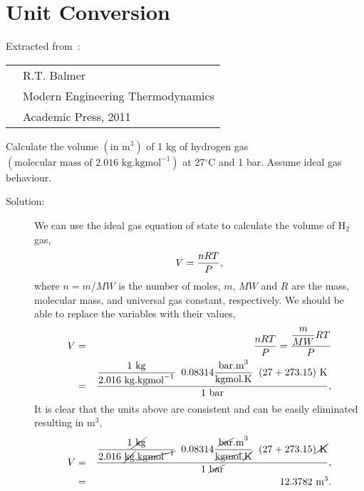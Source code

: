
\chapter{Unit Conversion}


Extracted from~\cite{Balmer_Book}:\\
  \begin{tabular}{c l}
     \hspace{1cm} & R.T. Balmer \\
                  & Modern Engineering Thermodynamics \\
                  & Academic Press, 2011  \\
  \end{tabular}


\begin{list}{\bf Example :~}{}
%
   \item\label{Example:UnitConversion1} Calculate the volume $\left(\text{in m}^{3}\right)$ of 1 kg of hydrogen gas $\left(\text{molecular mass of 2.016 kg.kgmol}^{-1}\right)$ at 27$^{\circ}$C and 1 bar. Assume ideal gas behaviour.
     \begin{description}
        \item[Solution:] We can use the ideal gas equation of state to calculate the volume of H$_{2}$ gas,
           \begin{displaymath}
              V = \displaystyle\frac{nRT}{P},
           \end{displaymath}
           where $n = m/MW$ is the number of moles, $m$, $MW$ and $R$ are the mass, molecular mass, and universal gas constant, respectively. We should be able to replace the variables with their values,
           \begin{eqnarray}
              V &=& \displaystyle\frac{nRT}{P} = \displaystyle\frac{ \displaystyle\frac{m}{MW} R T }{ P } \nonumber \\
                &=& \displaystyle\frac{ \displaystyle\frac{ 1\text{ kg}}{ 2.016\text{ kg.kgmol}^{-1}}\;\; 0.08314\displaystyle\frac{\text{bar.m}^{3}}{\text{kgmol.K}}\;\; ( 27 + 273.15)\text{ K}}{ 1 \text{ bar}},\nonumber
           \end{eqnarray}
           It is clear that the units above are consistent and can be easily eliminated resulting in m$^{3}$,
           \begin{eqnarray}
              V &=& \displaystyle\frac{ \displaystyle\frac{ 1\cancel{\text{ kg}}}{ 2.016\text{ \cancel{kg}.}\cancel{\text{kgmol}^{-1}}}\;\; 0.08314\displaystyle\frac{\text{\cancel{bar}.m}^{3}}{\text{\cancel{kgmol}.\cancel{K}}}\;\; ( 27 + 273.15)\cancel{\text{ K}}}{ 1 \text{ \cancel{bar}}},\nonumber \\
                &=& 12.3782\text{ m}^{3}.\nonumber
           \end{eqnarray}


\end{description}
\end{list}
